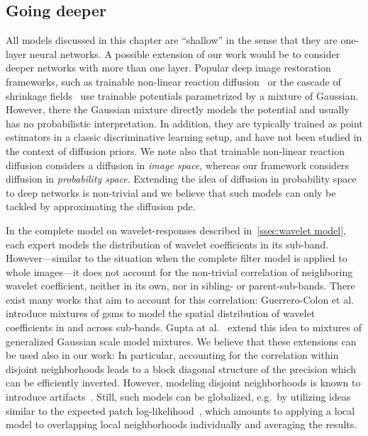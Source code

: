 \subsection{Going deeper}
All models discussed in this chapter are \enquote{shallow} in the sense that they are one-layer neural networks.
A possible extension of our work would be to consider deeper networks with more than one layer.
Popular deep image restoration frameworks, such as trainable non-linear reaction diffusion~\cite{chen_trainable_2017} or the cascade of shrinkage fields~\cite{schmidt_shrinkage_2014} use trainable potentials parametrized by a mixture of Gaussian.
However, there the Gaussian mixture directly models the potential and usually has no probabilistic interpretation.
In addition, they are typically trained as point estimators in a classic discriminative learning setup, and have not been studied in the context of diffusion priors.
We note also that trainable non-linear reaction diffusion considers a diffusion in \emph{image space}, whereas our framework considers diffusion in \emph{probability space}.
Extending the idea of diffusion in probability space to deep networks is non-trivial and we believe that such models can only be tackled by approximating the diffusion \gls{pde}.

In the complete model on wavelet-responses described in~\cref{ssec:wavelet model}, each expert models the distribution of wavelet coefficients in its sub-band.
However---similar to the situation when the complete filter model is applied to whole images---it does not account for the non-trivial correlation of neighboring wavelet coefficient, neither in its own, nor in sibling- or parent-sub-bands.
There exist many works that aim to account for this correlation:
Guerrero-Colon et al.~\cite{guerrero-colon_image_2008} introduce mixtures of \glspl{gsm} to model the spatial distribution of wavelet coefficients in and across sub-bands.
Gupta at al.~\cite{gupta_generalized_2018} extend this idea to mixtures of generalized Gaussian scale model mixtures.
We believe that these extensions can be used also in our work:
In particular, accounting for the correlation within disjoint neighborhoods leads to a block diagonal structure of the precision which can be efficiently inverted.
However, modeling disjoint neighborhoods is known to introduce artifacts~\cite{portilla_image_2003}.
Still, such models can be globalized, e.g.\ by utilizing ideas similar to the expected patch log-likelihood~\cite{zoran_learning_2011}, which amounts to applying a local model to overlapping local neighborhoods individually and averaging the results.

